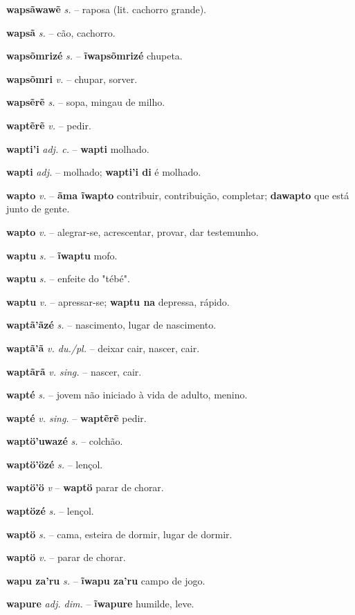 \textbf{wapsãwawẽ} \textit{s.} -- raposa (lit. cachorro grande).

\textbf{wapsã} \textit{s.} -- cão, cachorro.

\textbf{wapsõmrizé} \textit{s.} -- \textbf{ĩwapsõmrizé} chupeta.

\textbf{wapsõmri} \textit{v.} -- chupar, sorver.

\textbf{wapsẽrẽ} \textit{s.} -- sopa, mingau de milho.

\textbf{waptẽrẽ} \textit{v.} -- pedir.

\textbf{wapti'i} \textit{adj. c.} -- \textbf{wapti} molhado.

\textbf{wapti} \textit{adj.} -- molhado; \textbf{wapti'i di} é molhado.

\textbf{wapto} \textit{v.} -- \textbf{ãma ĩwapto} contribuir, contribuição, completar; \textbf{dawapto} que está junto de gente.

\textbf{wapto} \textit{v.} -- alegrar-se, acrescentar, provar, dar testemunho.

\textbf{waptu} \textit{s.} -- \textbf{ĩwaptu} mofo.

\textbf{waptu} \textit{s.} -- enfeite do "tébé".

\textbf{waptu} \textit{v.} -- apressar-se; \textbf{waptu na} depressa, rápido.

\textbf{waptã'ãzé} \textit{s.} -- nascimento, lugar de nascimento.

\textbf{waptã'ã} \textit{v. du./pl.} -- deixar cair, nascer, cair.

\textbf{waptãrã} \textit{v. sing.} -- nascer, cair.

\textbf{wapté} \textit{s.} -- jovem não iniciado à vida de adulto, menino.

\textbf{wapté} \textit{v. sing.} -- \textbf{waptẽrẽ} pedir.

\textbf{waptö'uwazé} \textit{s.} -- colchão.

\textbf{waptö'özé} \textit{s.} -- lençol.

\textbf{waptö'ö} \textit{v} -- \textbf{waptö} parar de chorar.

\textbf{waptözé} \textit{s.} -- lençol.

\textbf{waptö} \textit{s.} -- cama, esteira de dormir, lugar de dormir.

\textbf{waptö} \textit{v.} -- parar de chorar.

\textbf{wapu za'ru} \textit{s.} -- \textbf{ĩwapu za'ru} campo de jogo.

\textbf{wapure} \textit{adj. dim.} -- \textbf{ĩwapure} humilde, leve.

